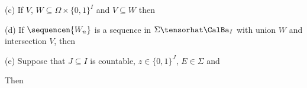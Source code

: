 (c) If $V$, $W\subseteq\Omega\times\{0,1\}^I$ and $V\subseteq W$ then


(d) If $\sequencen{W_n}$ is a sequence in $\Sigma\tensorhat\CalBa_I$
with union $W$ and intersection $V$, then


(e) Suppose that $J\subseteq I$ is countable, $z\in\{0,1\}^J$, $E\in\Sigma$
and


\noindent Then



